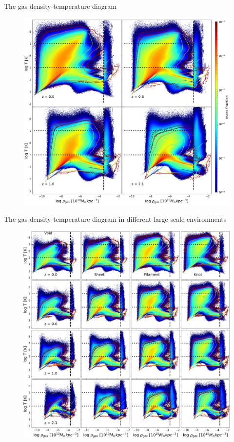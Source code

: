 \documentclass[aspectratio=43]{beamer}
\begin{document}
\begin{frame}{The gas density-temperature diagram}
  \begin{figure}
    \includegraphics[width=0.7\linewidth]{RT-evolution.png}
  \end{figure}
\end{frame}

\begin{frame}{The gas density-temperature diagram in different large-scale environments}
  \begin{figure}
    \includegraphics[width=0.6\linewidth]{RTE-evolution.png}
  \end{figure}
\end{frame}
\end{document}
